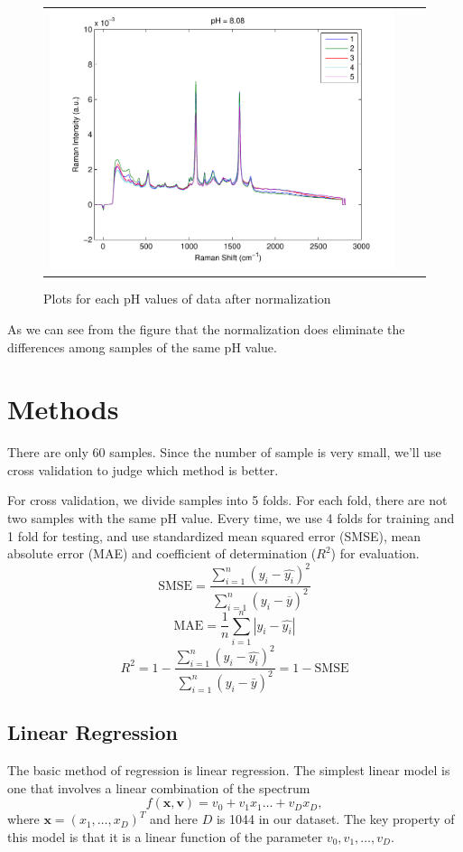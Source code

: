 \documentclass[a4paper]{article}
\newcommand{\bfv}{\mathbf{v}}
\newcommand{\bfx}{\mathbf{x}}
\begin{document}
\begin{figure}[h]
\begin{tabular}{ccc}
\includegraphics[width=.33\textwidth]{images/n12.pdf} \\
\end{tabular}
\caption{Plots for each pH values of data after normalization}\label{pic3}
\end{figure}

As we can see from the figure that the normalization does eliminate the differences among samples of the same pH value.
\section{Methods}
There are only 60 samples. Since the number of sample is very small, we'll use cross validation to judge which method is better.

For cross validation, we divide samples into 5 folds. For each fold, there are not two samples with the same pH value. Every time, we use 4 folds for training and 1 fold for testing, and use standardized mean squared error (SMSE), mean absolute error (MAE) and coefficient of determination ($R^2$) for evaluation. 
\begin{equation}
\mathrm{SMSE}=\frac{\displaystyle \sum_{i=1}^n (y_i-\hat{y_i})^2}{\displaystyle \sum_{i=1}^n (y_i-\overline{y})^2}
\end{equation}
\begin{equation}
\mathrm{MAE}=\frac{1}{n} \sum_{i=1}^n |y_i - \hat{y_i}|
\end{equation}
\begin{equation}
R^2=1-\frac{\displaystyle \sum_{i=1}^n (y_i - \hat{y_i})^2}{\displaystyle \sum_{i=1}^n (y_i - \bar{y})^2}=1-\mathrm{SMSE}
\end{equation}
\subsection{Linear Regression}
The basic method of regression is linear regression. The simplest linear model is one that involves a linear combination of the spectrum
\begin{equation}
f(\bfx,\bfv)=v_0+v_1x_1\ldots+v_Dx_D,
\end{equation}
where $\bfx=(x_1,\ldots,x_D)^T$ and here $D$ is 1044 in our dataset. The key property of this model is that it is a linear function of the parameter $v_0,v_1,\ldots,v_D$. 
\end{document}
